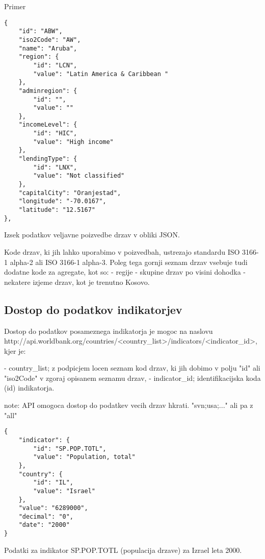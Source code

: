 Primer

\begin{snippet}
\begin{center}
\begin{lstlisting}
{
    "id": "ABW",
    "iso2Code": "AW",
    "name": "Aruba",
    "region": {
        "id": "LCN",
        "value": "Latin America & Caribbean "
    },
    "adminregion": {
        "id": "",
        "value": ""
    },
    "incomeLevel": {
        "id": "HIC",
        "value": "High income"
    },
    "lendingType": {
        "id": "LNX",
        "value": "Not classified"
    },
    "capitalCity": "Oranjestad",
    "longitude": "-70.0167",
    "latitude": "12.5167"
},
\end{lstlisting}
\end{center}
\caption[some]{Izsek podatkov veljavne poizvedbe  drzav v obliki JSON.
}

\label{country_response}
\end{snippet} 

Kode drzav, ki jih lahko uporabimo v poizvedbah, ustrezajo standardu ISO 
3166-1  
alpha-2 ali ISO 3166-1 alpha-3.
Poleg tega gornji seznam drzav vsebuje tudi dodatne kode za agregate, kot so:
- regije
- skupine drzav po visini dohodka
- nekatere izjeme drzav, kot je trenutno Kosovo.



\subsection{Dostop do podatkov indikatorjev}
Dostop do podatkov posameznega indikatorja je mogoc na naslovu
http://api.worldbank.org/countries/<country\_list>/indicators/<indicator\_id>,
kjer je:

- country\_list; z podpicjem locen seznam kod drzav, ki jih dobimo v polju "id"
ali "iso2Code" v zgoraj opisanem seznamu drzav,
- indicator\_id; identifikacijska koda (id) indikatorja.


note: API omogoca dostop do podatkev vecih drzav hkrati. "svn;usa;..." ali pa
z "all"


\begin{snippet}
\begin{center}
\begin{lstlisting}
{
    "indicator": {
        "id": "SP.POP.TOTL",
        "value": "Population, total"
    },
    "country": {
        "id": "IL",
        "value": "Israel"
    },
    "value": "6289000",
    "decimal": "0",
    "date": "2000"
}
\end{lstlisting}
\end{center}
\caption{Podatki za indikator SP.POP.TOTL (populacija drzave) za Izrael leta
2000.}
\label{country_response}
\end{snippet} 


